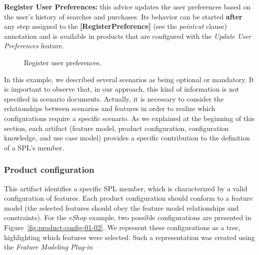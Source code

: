 \documentclass{acm_proc_article-sp}
\begin{document}
{\bf Register User Preferences:} this advice updates the user preferences based
on the user's history of searches and purchases. Its behavior can be started {\bf
after} any step assigned to the {\bf [RegisterPreference]} (see the
\emph{pointcut} clause) annotation and is available in products that are
configured with the \emph{Update User Preferences} feature.

\begin{figure}[h]
\caption{Register user preferences.}
\label{fig:register-preferences-flow}
\end{figure}

In this example, we described several scenarios as being optional or
mandatory. It is important to observe that, in our approach, this kind of
information is not specified in scenario documents. Actually, it is necessary to
consider the relationships between scenarios and features in order to realize
which configurations require a specific scenario. As we explained at the
beginning of this section, each artifact (feature model, product configuration,
configuration knowledge, and use case model) provides a specific contribution to
the definition of a SPL's member.


\subsubsection{Product configuration}\label{subsub:pc}

This artifact identifies a specific SPL member, which is characterized by a valid
configuration of features. Each product configuration should conform to a feature
model (the selected features should obey the feature model relationships and
constraints). For the \emph{eShop} example, two possible configurations are
presented in Figure~\ref{fig:product-config-01-02}. We represent these configurations as a
tree, highlighting which features were selected. Such a representation was
created using the \emph{Feature Modeling Plug-in}~\cite{Czarnecki:2004aa}
\end{document}
